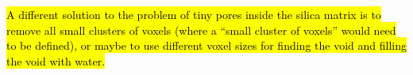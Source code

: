\hl{A different solution to the problem of tiny pores inside the silica matrix is to remove all small clusters of voxels (where a ``small cluster of voxels'' would need to be defined), or maybe to use different voxel sizes for finding the void and filling the void with water.}


